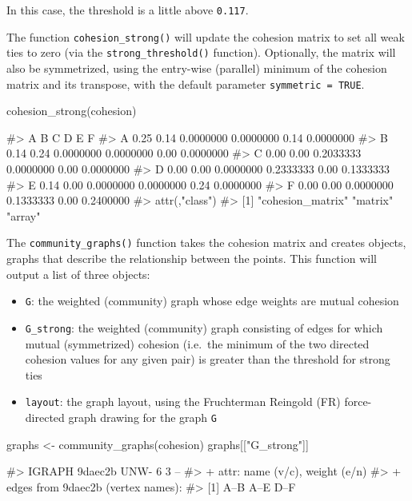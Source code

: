 In this case, the threshold is a little above \texttt{0.117}.

The function \texttt{cohesion\_strong()} will update the cohesion matrix
to set all weak ties to zero (via the \texttt{strong\_threshold()}
function). Optionally, the matrix will also be symmetrized, using the
entry-wise (parallel) minimum of the cohesion matrix and its transpose,
with the default parameter \texttt{symmetric\ =\ TRUE}.

\begin{Schunk}
\begin{Sinput}
cohesion_strong(cohesion)
\end{Sinput}
\begin{Soutput}
#>      A    B         C         D    E         F
#> A 0.25 0.14 0.0000000 0.0000000 0.14 0.0000000
#> B 0.14 0.24 0.0000000 0.0000000 0.00 0.0000000
#> C 0.00 0.00 0.2033333 0.0000000 0.00 0.0000000
#> D 0.00 0.00 0.0000000 0.2333333 0.00 0.1333333
#> E 0.14 0.00 0.0000000 0.0000000 0.24 0.0000000
#> F 0.00 0.00 0.0000000 0.1333333 0.00 0.2400000
#> attr(,"class")
#> [1] "cohesion_matrix" "matrix"          "array"
\end{Soutput}
\end{Schunk}

The \texttt{community\_graphs()} function takes the cohesion matrix and
creates  objects, graphs that describe the relationship
between the points. This function will output a list of three objects:

\begin{itemize}
\tightlist
\item
  \texttt{G}: the weighted (community) graph whose edge weights are
  mutual cohesion
\item
  \texttt{G\_strong}: the weighted (community) graph consisting of edges
  for which mutual (symmetrized) cohesion (i.e.~the minimum of the two
  directed cohesion values for any given pair) is greater than the
  threshold for strong ties
\item
  \texttt{layout}: the graph layout, using the Fruchterman Reingold (FR)
  force-directed graph drawing for the graph \texttt{G}
\end{itemize}

\begin{Schunk}
\begin{Sinput}
graphs <- community_graphs(cohesion)
graphs[["G_strong"]]
\end{Sinput}
\begin{Soutput}
#> IGRAPH 9daec2b UNW- 6 3 -- 
#> + attr: name (v/c), weight (e/n)
#> + edges from 9daec2b (vertex names):
#> [1] A--B A--E D--F
\end{Soutput}
\end{Schunk}

